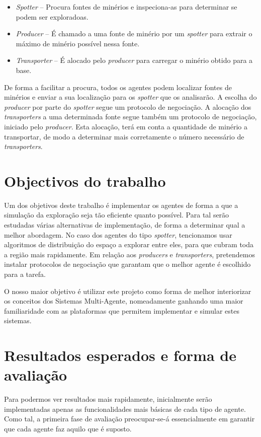 \documentclass[12pt]{report}
\begin{document}
\begin{itemize}
  \item \emph{Spotter} – Procura fontes de minérios e inspeciona-as para determinar se podem ser exploradoas. 
  \item \emph{Producer} – É chamado a uma fonte de minério por um \emph{spotter} para extrair o máximo de minério possível nessa fonte. 
  \item \emph{Transporter} – É alocado pelo \emph{producer} para carregar o minério obtido para a base.
\end{itemize}

De forma a facilitar a procura, todos os agentes podem localizar fontes de minérios e enviar a sua localização para os \emph{spotter} que os analisarão. A escolha do \emph{producer} por parte do \emph{spotter} segue um protocolo de negociação. A alocação dos \emph{transporters} a uma determinada fonte segue também um protocolo de negociação, iniciado pelo \emph{producer}. Esta alocação, terá em conta a quantidade de minério a transportar, de modo a determinar mais corretamente o número necessário de \emph{transporters}.

\section{Objectivos do trabalho}

Um dos objetivos deste trabalho é implementar os agentes de forma a que a simulação da exploração seja tão eficiente quanto possível. Para tal serão estudadas várias alternativas de implementação, de forma a determinar qual a melhor abordagem. No caso dos agentes do tipo \emph{spotter}, tencionamos usar algoritmos de distribuição do espaço a explorar entre eles, para que cubram toda a região mais rapidamente. Em relação aos \emph{producers} e \emph{transporters}, pretendemos instalar protocolos de negociação que garantam que o melhor agente é escolhido para a tarefa.

O nosso maior objetivo é utilizar este projeto como forma de melhor interiorizar os conceitos dos Sistemas Multi-Agente, nomeadamente ganhando uma maior familiaridade com as plataformas que permitem implementar e simular estes sistemas.

\section{Resultados esperados e forma de avaliação}

Para podermos ver resultados mais rapidamente, inicialmente serão implementadas apenas as funcionalidades mais básicas de cada tipo de agente. Como tal, a primeira fase de avaliação preocupar-se-á essencialmente em garantir que cada agente faz aquilo que é suposto.
\end{document}

